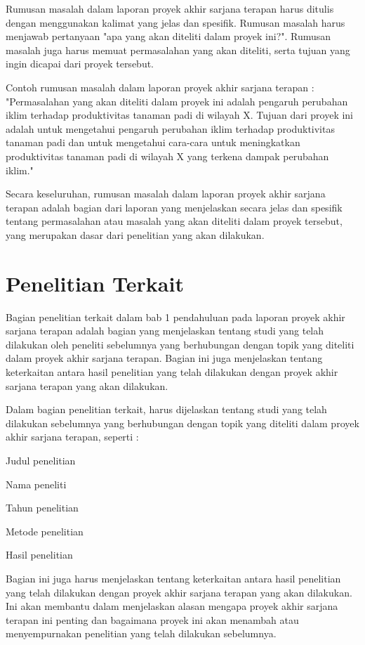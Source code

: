 Rumusan masalah dalam laporan proyek akhir sarjana terapan harus ditulis dengan menggunakan kalimat yang jelas dan spesifik. Rumusan masalah harus menjawab pertanyaan "apa yang akan diteliti dalam proyek ini?". Rumusan masalah juga harus memuat permasalahan yang akan diteliti, serta tujuan yang ingin dicapai dari proyek tersebut.

Contoh rumusan masalah dalam laporan proyek akhir sarjana terapan :
"Permasalahan yang akan diteliti dalam proyek ini adalah pengaruh perubahan iklim terhadap produktivitas tanaman padi di wilayah X. Tujuan dari proyek ini adalah untuk mengetahui pengaruh perubahan iklim terhadap produktivitas tanaman padi dan untuk mengetahui cara-cara untuk meningkatkan produktivitas tanaman padi di wilayah X yang terkena dampak perubahan iklim."

Secara keseluruhan, rumusan masalah dalam laporan proyek akhir sarjana terapan adalah bagian dari laporan yang menjelaskan secara jelas dan spesifik tentang permasalahan atau masalah yang akan diteliti dalam proyek tersebut, yang merupakan dasar dari penelitian yang akan dilakukan.

\section{Penelitian Terkait}
Bagian penelitian terkait dalam bab 1 pendahuluan pada laporan proyek akhir sarjana terapan adalah bagian yang menjelaskan tentang studi yang telah dilakukan oleh peneliti sebelumnya yang berhubungan dengan topik yang diteliti dalam proyek akhir sarjana terapan. Bagian ini juga menjelaskan tentang keterkaitan antara hasil penelitian yang telah dilakukan dengan proyek akhir sarjana terapan yang akan dilakukan.

Dalam bagian penelitian terkait, harus dijelaskan tentang studi yang telah dilakukan sebelumnya yang berhubungan dengan topik yang diteliti dalam proyek akhir sarjana terapan, seperti :

\begin{packed_enum}
    \item Judul penelitian
    \item Nama peneliti
    \item Tahun penelitian
    \item Metode penelitian
    \item Hasil penelitian
\end{packed_enum}

Bagian ini juga harus menjelaskan tentang keterkaitan antara hasil penelitian yang telah dilakukan dengan proyek akhir sarjana terapan yang akan dilakukan. Ini akan membantu dalam menjelaskan alasan mengapa proyek akhir sarjana terapan ini penting dan bagaimana proyek ini akan menambah atau menyempurnakan penelitian yang telah dilakukan sebelumnya.

